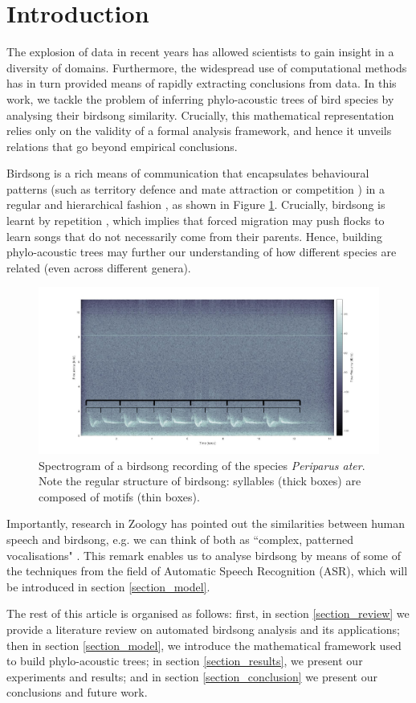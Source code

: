 \documentclass[pdftex,11pt,a4paper]{article}
\theoremstyle{definition}
\theoremstyle{remark}
\begin{document}
\section{Introduction}
\label{section_introduction}
The explosion of data in recent years has allowed scientists to gain insight in a diversity of domains. Furthermore, the widespread use of computational methods has in turn provided means of rapidly extracting conclusions from data. In this work, we tackle the problem of inferring phylo-acoustic trees of bird species by analysing their birdsong similarity. Crucially, this mathematical representation relies only on the validity of a formal analysis framework, and hence it unveils relations that go beyond empirical conclusions. 
\par Birdsong is a rich means of communication that encapsulates behavioural patterns (such as territory defence and mate attraction or competition \cite{Berwick2013, Naguib2014}) in a regular and hierarchical fashion \cite{Snowdon2013}, as shown in Figure \ref{fig_birdsong_structure}. Crucially, birdsong is learnt by repetition \cite{Berwick2013}, which implies that forced migration may push flocks to learn songs that do not necessarily come from their parents. Hence, building phylo-acoustic trees may further our understanding of how different species are related (even across different genera).
\begin{figure}[t]
\centering
\includegraphics[width=\textwidth]{images/birdsong_structure}
\caption{Spectrogram of a birdsong recording of the species \emph{Periparus ater}. Note the regular structure of birdsong: syllables (thick boxes) are composed of motifs (thin boxes).}
\label{fig_birdsong_structure}
\end{figure}
\par Importantly, research in Zoology has pointed out the similarities between human speech and birdsong, e.g. we can think of both as ``complex, patterned vocalisations" \cite{Berwick2013,Naguib2014}. This remark enables us to analyse birdsong by means of some of the techniques from the field of Automatic Speech Recognition (ASR), which will be introduced in section \ref{section_model}. 
\par The rest of this article is organised as follows: first, in section \ref{section_review} we provide a literature review on automated birdsong analysis and its applications; then in section \ref{section_model}, we introduce the mathematical framework used to build phylo-acoustic trees; in section \ref{section_results}, we present our experiments and results; and in section \ref{section_conclusion} we present our conclusions and future work.
\end{document}
